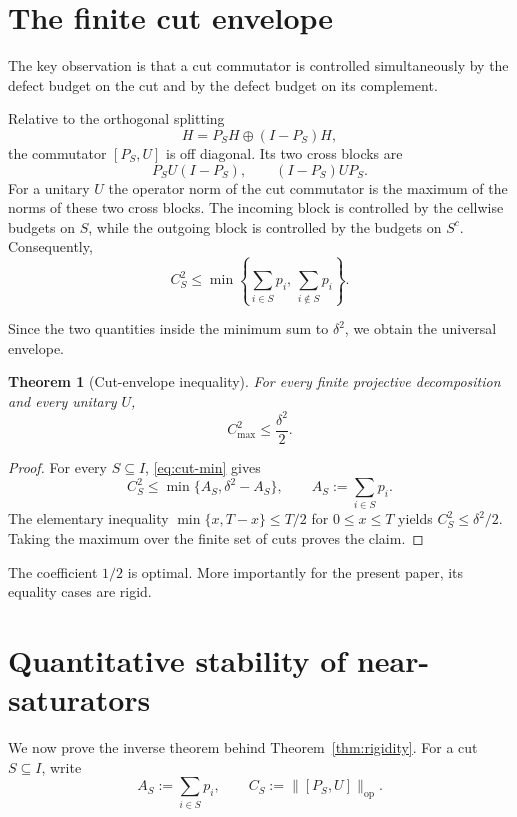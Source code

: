 \documentclass[11pt]{article}
\newtheorem{theorem}{Theorem}[section]
\newcommand{\op}{\mathrm{op}}
\newcommand{\cmax}{C_{\max}}
\newcommand{\dd}{\delta}
\begin{document}
\section{The finite cut envelope}

The key observation is that a cut commutator is controlled simultaneously by
the defect budget on the cut and by the defect budget on its complement.

Relative to the orthogonal splitting
\[
  H=P_SH\oplus (I-P_S)H,
\]
the commutator $[P_S,U]$ is off diagonal.  Its two cross blocks are
\[
  P_SU(I-P_S),
  \qquad
  (I-P_S)UP_S.
\]
For a unitary $U$ the operator norm of the cut commutator is the maximum of
the norms of these two cross blocks.  The incoming block is controlled by the
cellwise budgets on $S$, while the outgoing block is controlled by the
budgets on $S^c$.  Consequently,
\begin{equation}\label{eq:cut-min}
  C_S^2
  \le
  \min\left\{
    \sum_{i\in S}p_i,\,
    \sum_{i\notin S}p_i
  \right\}.
\end{equation}

Since the two quantities inside the minimum sum to $\dd^2$, we obtain the
universal envelope.

\begin{theorem}[Cut-envelope inequality]\label{thm:envelope}
For every finite projective decomposition and every unitary $U$,
\[
  \boxed{\cmax^2\le\frac{\dd^2}{2}}.
\]
\end{theorem}

\begin{proof}
For every $S\subseteq I$, \eqref{eq:cut-min} gives
\[
  C_S^2
  \le
  \min\{A_S,\dd^2-A_S\},
  \qquad
  A_S:=\sum_{i\in S}p_i.
\]
The elementary inequality
$\min\{x,T-x\}\le T/2$ for $0\le x\le T$ yields
$C_S^2\le\dd^2/2$.  Taking the maximum over the finite set of cuts proves the
claim.
\end{proof}

The coefficient $1/2$ is optimal.  More importantly for the present paper,
its equality cases are rigid.

\section{Quantitative stability of near-saturators}

We now prove the inverse theorem behind Theorem~\ref{thm:rigidity}.  For a
cut $S\subseteq I$, write
\[
  A_S:=\sum_{i\in S}p_i,
  \qquad
  C_S:=\|[P_S,U]\|_{\op}.
\]
\end{document}

